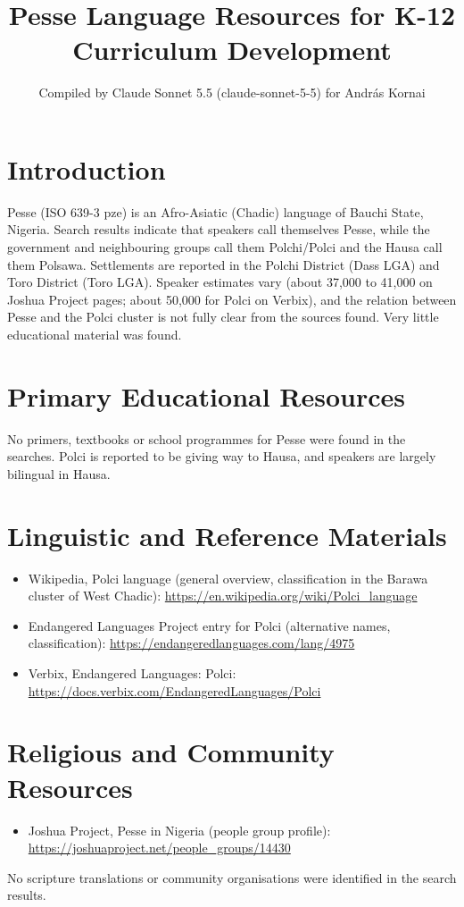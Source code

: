 \documentclass[12pt]{article}
\title{Pesse Language Resources for K-12 Curriculum Development}
\author{Compiled by Claude Sonnet 5.5 (claude-sonnet-5-5) for Andr\'as Kornai}
\date{}
\begin{document}
\maketitle

\section{Introduction}
Pesse (ISO 639-3 pze) is an Afro-Asiatic (Chadic) language of Bauchi State, Nigeria. Search results indicate that speakers call themselves Pesse, while the government and neighbouring groups call them Polchi/Polci and the Hausa call them Polsawa. Settlements are reported in the Polchi District (Dass LGA) and Toro District (Toro LGA). Speaker estimates vary (about 37,000 to 41,000 on Joshua Project pages; about 50,000 for Polci on Verbix), and the relation between Pesse and the Polci cluster is not fully clear from the sources found. Very little educational material was found.

\section{Primary Educational Resources}
No primers, textbooks or school programmes for Pesse were found in the searches. Polci is reported to be giving way to Hausa, and speakers are largely bilingual in Hausa.

\section{Linguistic and Reference Materials}
\begin{itemize}
\item Wikipedia, Polci language (general overview, classification in the Barawa cluster of West Chadic): \url{https://en.wikipedia.org/wiki/Polci_language}
\item Endangered Languages Project entry for Polci (alternative names, classification): \url{https://endangeredlanguages.com/lang/4975}
\item Verbix, Endangered Languages: Polci: \url{https://docs.verbix.com/EndangeredLanguages/Polci}
\end{itemize}

\section{Religious and Community Resources}
\begin{itemize}
\item Joshua Project, Pesse in Nigeria (people group profile): \url{https://joshuaproject.net/people_groups/14430}
\end{itemize}
No scripture translations or community organisations were identified in the search results.
\end{document}
